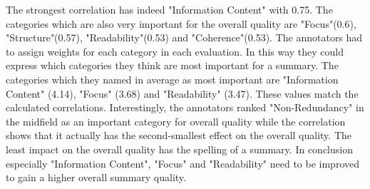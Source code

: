 The strongest correlation has indeed "Information Content" with 0.75. The categories which are also very important for the overall quality are "Focus"(0.6), "Structure"(0.57), "Readability"(0.53) and "Coherence"(0.53). The annotators had to assign weights for each category in each evaluation. In this way they could express which categories they think are most important for a summary. The categories which they named in average as most important are "Information Content" (4.14), "Focus" (3.68) and "Readability" (3.47). These values match the calculated correlations. Interestingly, the annotators ranked "Non-Redundancy" in the midfield as an important category for overall quality while the correlation shows that it actually has the second-smallest effect on the overall quality. The least impact on the overall quality has the spelling of a summary. In conclusion especially "Information Content", "Focus" and "Readability" need to be improved to gain a higher overall summary quality.
